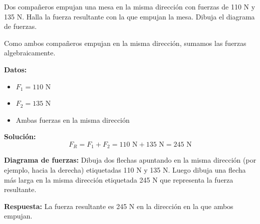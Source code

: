 \begin{exercise}
    Dos compañeros empujan una mesa en la misma dirección con fuerzas de 110 N y 135 N. Halla la fuerza resultante con la que empujan la mesa.
    Dibuja el diagrama de fuerzas.


    \begin{solu}
        Como ambos compañeros empujan en la misma dirección, sumamos las fuerzas algebraicamente.

        \textbf{Datos:}
        \begin{itemize}
            \item $F_1 = 110$ N
            \item $F_2 = 135$ N
            \item Ambas fuerzas en la misma dirección
        \end{itemize}

        \textbf{Solución:}
        $$F_R = F_1 + F_2 = 110\text{ N} + 135\text{ N} = 245\text{ N}$$

        \textbf{Diagrama de fuerzas:} Dibuja dos flechas apuntando en la misma dirección (por ejemplo, hacia la derecha) etiquetadas 110 N y 135 N. Luego dibuja una flecha más larga en la misma dirección etiquetada 245 N que representa la fuerza resultante.

        \textbf{Respuesta:} La fuerza resultante es 245 N en la dirección en la que ambos empujan.
    \end{solu}
\end{exercise}


